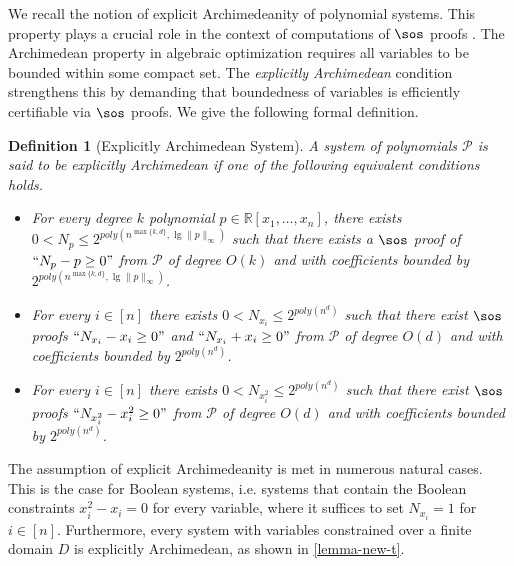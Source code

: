 \documentclass[11pt]{article}
\newtheorem{definition}[theorem]{Definition}
\begin{document}
We recall the notion of explicit Archimedeanity of polynomial systems. This property plays a crucial role in the context of computations of $\sos$ proofs \cite{JoszH16,Laurent2009}. The Archimedean property in algebraic optimization requires all variables to be bounded within some compact set. The \emph{explicitly Archimedean} condition strengthens this by demanding that boundedness of variables is efficiently certifiable via $\sos$ proofs. We give the following formal definition.

\begin{definition}[Explicitly Archimedean System]
    A system of polynomials $\mathcal{P}$ is said to be \emph{explicitly Archimedean} if one of the following equivalent conditions holds.
    \begin{itemize}
        \item \label{def:exp_arch} For every degree $k$ polynomial $p\in \mathbb{R}[x_1, \dots, x_n]$, there exists $0<N_p \leq 2^{poly(n^{\max\{k,d\}}, \lg \|p\|_{\infty})}$ such that there exists a $\sos$ proof of $``N_p-p\geq 0"$ from $\mathcal{P}$ of degree $O(k)$ and with coefficients bounded by $2^{poly(n^{\max\{k,d\}}, \lg \|p\|_{\infty})}$.
        \item \label{prop:bounded_variables_archimedeanity} For every $i \in [n]$ there exists $0 < N_{x_i} \leq 2^{poly(n^d)}$ such that there exist $\sos$ proofs $``N_{x_i} - x_i \geq 0"$ and $``N_{x_i} + x_i \geq 0"$ from $\mathcal{P}$ of degree $O(d)$ and with coefficients bounded by $2^{poly(n^d)}$.
        \item For every $i \in [n]$ there exists $0 < N_{x_i^2} \leq 2^{poly(n^d)}$ such that there exist $\sos$ proofs $``N_{x_i^2} - x_i^2 \geq 0"$ from $\mathcal{P}$ of degree $O(d)$ and with coefficients bounded by $2^{poly(n^d)}$.
    \end{itemize}
\end{definition}

The assumption of explicit Archimedeanity is met in numerous natural cases. This is the case for Boolean systems, i.e. systems that contain the Boolean constraints $x_i^2 - x_i = 0$ for every variable, where it suffices to set $N_{x_i} = 1$ for $i \in [n]$. Furthermore, every system with variables constrained over a finite domain $D$ is explicitly Archimedean, as shown in \cref{lemma-new-t}.

\end{document}
